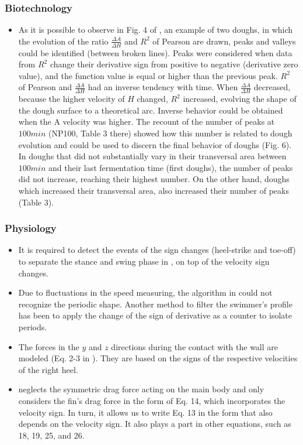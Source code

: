 \documentclass[11pt]{book}
\begin{document}
\subsubsection{Biotechnology}
\begin{itemize}
\item As it is possible to observe in Fig. 4 of \cite{ivorra2014continuous},
an example of two doughs, in which the evolution of the ratio $\frac{\Delta A}{\Delta H}$
and $R^{2}$ of Pearson are drawn, peaks and valleys could be identified
(between broken lines). Peaks were considered when data from $R^{2}$
change their derivative sign from positive to negative (derivative
zero value), and the function value is equal or higher than the previous
peak. $R^{2}$ of Pearson and $\frac{\Delta A}{\Delta H}$ had an
inverse tendency with time. When $\frac{\Delta A}{\Delta H}$ decreased,
because the higher velocity of $H$ changed, $R^{2}$ increased, evolving
the shape of the dough surface to a theoretical arc. Inverse behavior
could be obtained when the A velocity was higher. The recount of the
number of peaks at $100min$ (NP100, Table 3 there) showed how this
number is related to dough evolution and could be used to discern
the final behavior of doughs (Fig. 6). In doughs that did not substantially
vary in their transversal area between $100min$ and their last fermentation
time (first doughs), the number of peaks did not increase, reaching
their highest number. On the other hand, doughs which increased their
transversal area, also increased their number of peaks (Table 3).
\end{itemize}
\subsubsection{Physiology}
\begin{itemize}
\item It is required to detect the events of the sign changes (heel-strike
and toe-off) to separate the stance and swing phase in \cite{grimmer2019stance},
on top of the velocity sign changes.
\item Due to fluctuations in the speed measuring, the algorithm in \cite{zanchimachine}
could not recognize the periodic shape. Another method to filter the
swimmer's profile has been to apply the change of the
sign of derivative as a counter to isolate periods.
\item The forces in the $y$ and $z$ directions during the contact with
the wall are modeled (Eq. 2-3 in \cite{mori2020simulation}).
They are based on the signs of the respective velocities of the right
heel.
\item \cite{tahmasian2020dynamic}
neglects the symmetric drag force acting on the main body and only
considers the fin's drag force in the form of Eq. 14, which incorporates
the velocity sign. In turn, it allows us to write Eq. 13 in the form
that also depends on the velocity sign. It also plays a part in other
equations, such as 18, 19, 25, and 26.
\end{itemize}
\end{document}
